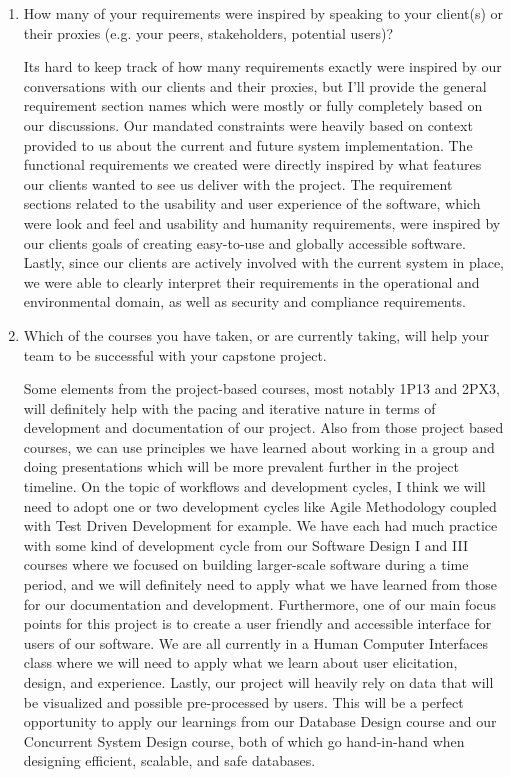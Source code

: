 \begin{enumerate}
  \item How many of your requirements were inspired by speaking to your
  client(s) or their proxies (e.g. your peers, stakeholders, potential users)?
  \par{Its hard to keep track of how many requirements exactly were inspired by our conversations with our clients and their proxies, but I'll provide the 
  general requirement section names which were mostly or fully completely based on our discussions. Our mandated constraints were heavily based on context 
  provided to us about the current and future system implementation. The functional requirements we created were directly inspired by what features our clients wanted 
  to see us deliver with the project. The requirement sections related to the usability and user experience of the software, which were look and feel 
  and usability and humanity requirements, were inspired by our clients goals of creating easy-to-use and globally accessible software. Lastly, since our clients are 
  actively involved with the current system in place, we were able to clearly interpret their requirements in the operational and environmental domain, 
  as well as security and compliance requirements.}

  \item Which of the courses you have taken, or are currently taking, will help
  your team to be successful with your capstone project.
  \par{Some elements from the project-based courses, most notably 1P13 and 2PX3, will definitely help with the pacing and iterative nature in terms of development and 
  documentation of our project. Also from those project based courses, we can use principles we have learned about working in a group and doing presentations which will 
  be more prevalent further in the project timeline. On the topic of workflows and development cycles, I think we will need to adopt one or two development cycles like 
  Agile Methodology coupled with Test Driven Development for example. We have each had much practice with some kind of development cycle from our Software Design I and III 
  courses where we focused on building larger-scale software during a time period, and we will definitely need to apply what we have learned from those for our documentation 
  and development. Furthermore, one of our main focus points for this project is to create a user friendly and accessible interface for users of our software. We are all 
  currently in a Human Computer Interfaces class where we will need to apply what we learn about user elicitation, design, and experience. Lastly, our project will heavily rely 
  on data that will be visualized and possible pre-processed by users. This will be a perfect opportunity to apply our learnings from our Database Design course and our Concurrent 
  System Design course, both of which go hand-in-hand when designing efficient, scalable, and safe databases.}
\end{enumerate}
